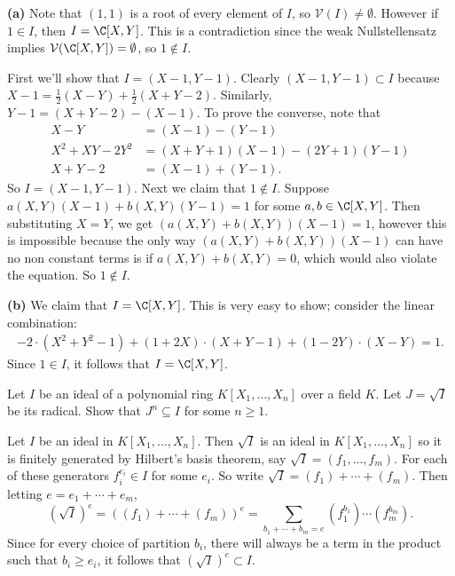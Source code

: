 \documentclass[11pt,letterpaper]{article}
\begin{document}
\begin{solution}
    \textbf{(a)} Note that $(1,1)$ is a root of every element of $I$, so $\mathcal{V}(I)\neq \emptyset$. However if $1\in I$, then $I=\C[X,Y]$. This is a contradiction since the weak Nullstellensatz implies $\mathcal{V}(\C[X,Y])=\emptyset$, so $1\not\in I$.
    
    First we'll show that $I=(X-1, Y-1)$. Clearly $(X-1, Y-1)\subset I$ because $X-1=\frac{1}{2}(X-Y)+\frac{1}{2}(X+Y-2)$. Similarly, $Y-1=(X+Y-2)-(X-1)$. To prove the converse, note that 
    \[
        \begin{aligned}
            X-Y&=(X-1)-(Y-1)\\
            X^2+XY-2Y^2&=(X+Y+1)(X-1)-(2Y+1)(Y-1)\\
            X+Y-2&=(X-1)+(Y-1).
        \end{aligned}
    \]   
    So $I=(X-1,Y-1)$. Next we claim that $1\not\in I$. Suppose $a(X,Y)(X-1)+b(X,Y)(Y-1)=1$ for some $a,b\in \C[X,Y]$. Then substituting $X=Y$, we get $\left(a(X,Y)+b(X,Y)\right)(X-1)=1$, however this is impossible because the only way $\left(a(X,Y)+b(X,Y)\right)(X-1)$ can have no non constant terms is if $a(X,Y)+b(X,Y)=0$, which would also violate the equation. So $1\not\in I$. 
    
    \textbf{(b)} We claim that $I=\C[X,Y]$. This is very easy to show; consider the linear combination:
    \[
        \begin{aligned}
            -2\cdot(X^2+Y^2-1)+(1+2X)\cdot(X+Y-1)+(1-2Y)\cdot (X-Y)=1.
        \end{aligned}
    \] 
    Since $1\in I$, it follows that $I=\C[X,Y]$. 
\end{solution}

\begin{problem}
    Let $I$ be an ideal of a polynomial ring $K[X_1,\dots,X_n]$ over a field $K$. Let $J=\sqrt I$ be its radical. Show that $J^n \subseteq I$ for some $n\geq1$.
\end{problem}

\begin{solution}
    Let $I$ be an ideal in $K[X_1,\ldots, X_n]$. Then $\sqrt{I}$ is an ideal in $K[X_1,\ldots,X_n]$ so it is finitely generated by Hilbert's basis theorem, say $\sqrt{I}=(f_1,\ldots,f_m)$. For each of these generators $f_i^{e_i}\in I$ for some $e_i$. So write $\sqrt{I}=(f_1)+\cdots+(f_m)$. Then letting $e=e_1+\cdots+e_m$, 
    \[
        \left(\sqrt{I}\right)^{e}=\left((f_1)+\cdots+(f_m)\right)^e=\sum_{b_1+\cdots+b_m=e} (f_1^{b_1})\cdots (f_m^{b_m})
    .\]
    Since for every choice of partition $b_i$, there will always be a term in the product such that $b_i\geq e_i$, it follows that $(\sqrt{I})^e\subset I$.        
\end{solution}
\end{document}
